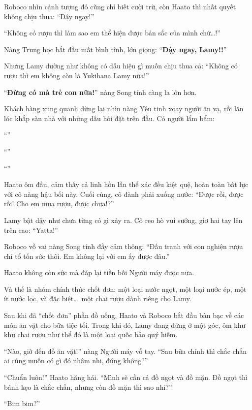 \documentclass[../main.tex]{subfiles}
\begin{document}
Roboco nhìn cảnh tượng đó cũng chỉ biết cười trừ, còn Haato thì nhất quyết không chịu thua: ``Dậy ngay!''

``Không có rượu thì làm sao em thể hiện được bản sắc của mình chứ\dots!''

Nàng Trung học bắt đầu mất bình tĩnh, lớn giọng: ``\textbf{Dậy ngay, Lamy!!}''

Nhưng Lamy dường như không có dấu hiệu gì muốn chịu thua cả: ``Không có rượu thì em không còn là Yukihana Lamy nữa!''

``\textbf{Đừng có mà trẻ con nữa!}'' nàng Song tính càng la lớn hơn.

Khách hàng xung quanh dừng lại nhìn nàng Yêu tinh xoay người ăn vạ, rồi lăn lóc khắp sàn nhà với những dấu hỏi đặt trên đầu. Có người lẩm bẩm:

``''

``''

``''

Haato ôm đầu, cảm thấy cả linh hồn lẫn thể xác đều kiệt quệ, hoàn toàn bất lực với cô nàng hậu bối này. Cuối cùng, cô đành phải xuống nước: ``Được rồi, được rồi! Cho em mua rượu, được chưa!?''

Lamy bật dậy như chưa từng có gì xảy ra. Cô reo hò vui sướng, giơ hai tay lên trên cao: ``Yatta!''

Roboco vỗ vai nàng Song tính đầy cảm thông: ``Đấu tranh với con nghiện rượu chỉ tổ tốn sức thôi. Em không lại với em ấy được đâu.''

Haato không còn sức mà đáp lại tiền bối Người máy được nữa.

Và thế là nhóm chính thức chốt đơn: một loại nước ngọt, một loại nước ép, một ít nước lọc, và đặc biệt\dots\ một chai rượu dành riêng cho Lamy.

\ct

Sau khi đã ``chốt đơn'' phần đồ uống, Haato và Roboco bắt đầu bàn bạc về các món ăn vặt cho bữa tiệc tối. Trong khi đó, Lamy đang đứng ở một góc, ôm khư khư chai rượu như thể đó là một loại quốc bảo quý hiếm.

``Nào, giờ đến đồ ăn vặt!'' nàng Người máy vỗ tay. ``Sau bữa chính thì chắc chắn ai cũng muốn có gì đó nhâm nhi, đúng không?''

``Chuẩn luôn!'' Haato hăng hái. ``Mình sẽ cần cả đồ ngọt và đồ mặn. Đồ ngọt thì bánh kẹo là chắc chắn, nhưng còn đồ mặn thì sao nhỉ?''

``Bim bim?''
\end{document}
